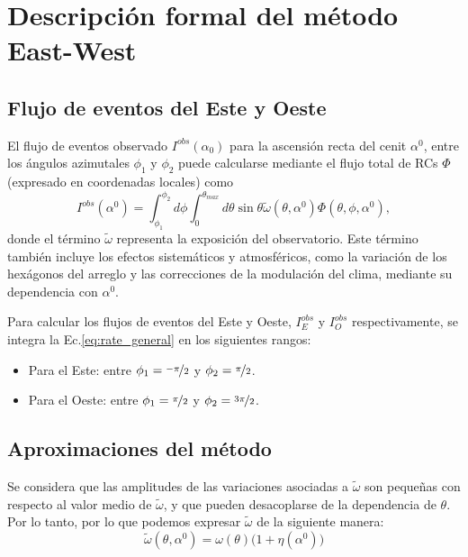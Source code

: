 \section{Descripción formal del método East-West}

    \subsection{Flujo de eventos del Este y Oeste}
    El flujo de eventos observado $I^{obs}(\alpha_0)$ para la ascensión recta del cenit $\alpha^0$, entre los ángulos azimutales $\phi_1$ y $\phi_2$ puede calcularse mediante el flujo total de RCs $\Phi$ (expresado en coordenadas locales) como
    \begin{equation}
        I^{obs}(\alpha^0) = \int_{\phi_1}^{\phi_2} d\phi \int_{0}^{\theta_{max}} d\theta \sin\theta \tilde{\omega}(\theta, \alpha^0) \Phi(\theta, \phi, \alpha^0),
        \label{eq:rate_general}
    \end{equation}
    \noindent  donde  el término $\tilde{\omega}$ representa la exposición del observatorio. Este término también incluye los efectos sistemáticos y atmosféricos, como la variación de los hexágonos del arreglo y las correcciones de la modulación del clima, mediante  su dependencia con $\alpha^0$.

    Para calcular los flujos de eventos del Este y Oeste, $I^{obs}_E$ y $I_O^{obs}$ respectivamente, se integra la Ec.\ref{eq:rate_general} en los siguientes  rangos:
    \begin{itemize}
        \item Para el Este: entre $\phi_1=\nicefrac{-\pi}{2}$ y $\phi_2=\nicefrac{\pi}{2}$.
        \item Para el Oeste: entre $\phi_1=\nicefrac{\pi}{2}$ y $\phi_2=\nicefrac{3\pi}{2}$.
    \end{itemize}

    \subsection{Aproximaciones del método}
    Se considera que las amplitudes de las variaciones asociadas a $\tilde{\omega}$ son pequeñas con respecto al valor medio de $\tilde{\omega}$, y que pueden  desacoplarse de la dependencia de $\theta$. Por lo tanto, por lo que podemos expresar $\tilde{\omega}$ de la siguiente manera:
    \begin{equation}
        \tilde{\omega}(\theta, \alpha^0) = \omega(\theta)\big(1 + \eta(\alpha^0) \big)
        \label{eq:omega_expandido}
    \end{equation}

